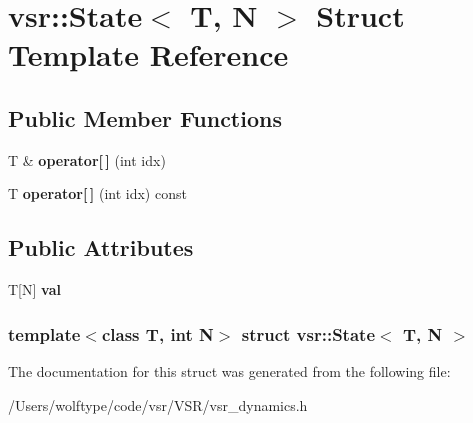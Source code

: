 \hypertarget{structvsr_1_1_state}{\section{vsr\-:\-:State$<$ T, N $>$ Struct Template Reference}
\label{structvsr_1_1_state}
}
\subsection*{Public Member Functions}
\begin{DoxyCompactItemize}
\item 
\hypertarget{structvsr_1_1_state_ac1efe2408bfddf9734de7392c21d502a}{T \& {\bfseries operator\mbox{[}$\,$\mbox{]}} (int idx)}\label{structvsr_1_1_state_ac1efe2408bfddf9734de7392c21d502a}

\item 
\hypertarget{structvsr_1_1_state_af94d0d80c2745abb7939d0f55caf3a38}{T {\bfseries operator\mbox{[}$\,$\mbox{]}} (int idx) const }\label{structvsr_1_1_state_af94d0d80c2745abb7939d0f55caf3a38}

\end{DoxyCompactItemize}
\subsection*{Public Attributes}
\begin{DoxyCompactItemize}
\item 
\hypertarget{structvsr_1_1_state_addbfa904513e6189f1558225485d564f}{T\mbox{[}N\mbox{]} {\bfseries val}}\label{structvsr_1_1_state_addbfa904513e6189f1558225485d564f}

\end{DoxyCompactItemize}
\subsubsection*{template$<$class T, int N$>$ struct vsr\-::\-State$<$ T, N $>$}



The documentation for this struct was generated from the following file\-:\begin{DoxyCompactItemize}
\item 
/\-Users/wolftype/code/vsr/\-V\-S\-R/vsr\-\_\-dynamics.\-h\end{DoxyCompactItemize}

